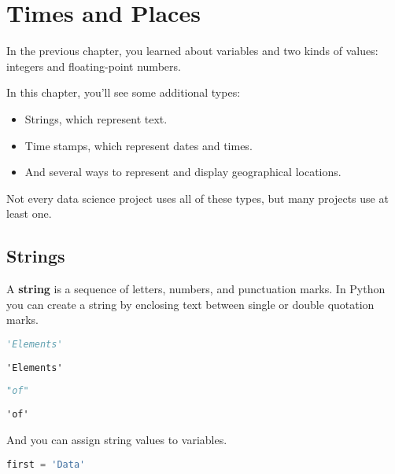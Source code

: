 \hypertarget{times-and-places}{%
\chapter{Times and Places}\label{times-and-places}}

In the previous chapter, you learned about variables and two kinds of
values: integers and floating-point numbers.

In this chapter, you'll see some additional types:

\begin{itemize}
\item
  Strings, which represent text.
\item
  Time stamps, which represent dates and times.
\item
  And several ways to represent and display geographical locations.
\end{itemize}

Not every data science project uses all of these types, but many
projects use at least one.

\hypertarget{strings}{%
\section{Strings}\label{strings}}

A \textbf{string} is a sequence of letters, numbers, and punctuation
marks. In Python you can create a string by enclosing text between
single or double quotation marks.

\begin{lstlisting}[language=Python,style=source]
'Elements'
\end{lstlisting}

\begin{lstlisting}[style=output]
'Elements'
\end{lstlisting}

\begin{lstlisting}[language=Python,style=source]
"of"
\end{lstlisting}

\begin{lstlisting}[style=output]
'of'
\end{lstlisting}

And you can assign string values to variables.

\begin{lstlisting}[language=Python,style=source]
first = 'Data'
\end{lstlisting}

